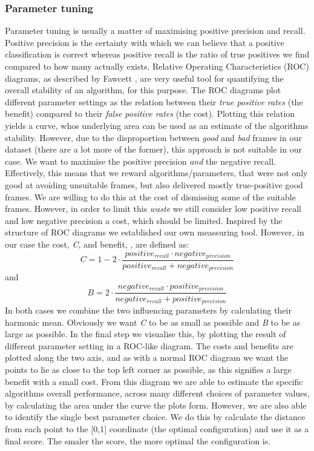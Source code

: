 \subsubsection{Parameter tuning} \label{sec:ph1tweaking}
%
Parameter tuning is usually a matter of maximising positive precision and recall. Positive precision is the certainty with which we can believe that a positive classification is correct whereas positive recall is the ratio of true positives we find compared to how many actually exists. Relative Operating Characteristics (ROC) diagrams, as described by Fawcett \cite{Fawcett06a}, are very useful tool for quantifying the overall stability of an algorithm, for this purpose. The ROC diagrams plot different parameter settings as the relation between their \textit{true positive rates} (the benefit) compared to their \textit{false positive rates} (the cost). Plotting this relation yields a curve, whos underlying area can be used as an estimate of the algorithms stability.
However, due to the disproportion between \textit{good} and \textit{bad} frames in our dataset (there are a lot more of the former), this approach is not suitable in our case. We want to maximise the positive precision \textit{and} the negative recall. Effectively, this means that we reward algorithms/parameters, that were not only good at avoiding unsuitable frames, but also delivered mostly true-positive good frames. We are willing to do this at the cost of dismissing some of the suitable frames. However, in order to limit this \textit{waste} we still consider low positive recall and low negative precision a cost, which should be limited. Inspired by the structure of ROC diagrams we established our own meassuring tool. However, in our case the cost, \textit{C}, and benefit, , are defined as:
\[
C = 1 - 2 \cdot \frac{positive_{recall} \cdot negative_{precision}}{positive_{recall} + negative_{precision}}
\]
and
\[
B = 2 \cdot \frac{negative_{recall} \cdot positive_{precision}}{negative_{recall} + positive_{precision}}
\]
In both cases we combine the two influencing parameters by calculating their harmonic mean. Obviously we want \textit{C} to be as small as possible and \textit{B} to be as large as possible. In the final step we visualise this, by plotting the result of different parameter setting in a ROC-like diagram. The costs and benefits are plotted along the two axis, and as with a normal ROC diagram we want the points to lie as close to the top left corner as possible, as this signifies a large benefit with a small cost. From this diagram we are able to estimate the specific algorithms overall performance, across many different choices of parameter values, by calculating the area under the curve the plots form. However, we are also able to identify the single best parameter choice. We do this by calculate the distance from each point to the [0,1] coordinate (the optimal configuration) and use it as a final score. The smaler the score, the more optimal the configuration is.
